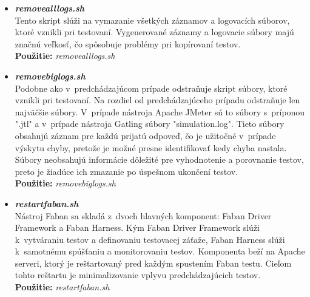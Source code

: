 \documentclass[12pt,oneside,final]{fithesis-utf8}
\newcommand\underscore[1]{\underline{\hspace{8pt}}}
\begin{document}
\begin{itemize}
\item \textit{\textbf{remove\underscore{}all\underscore{}logs.sh}}\\
Tento skript slúži na vymazanie všetkých záznamov a logovacích súborov, ktoré vznikli pri testovaní. Vygenerované záznamy a logovacie súbory majú značnú veľkosť, čo spôsobuje problémy pri kopírovaní testov.\\
\textbf{Použitie:} \textit{remove\underscore{}all\underscore{}logs.sh}

\item \textit{\textbf{remove\underscore{}big\underscore{}logs.sh}}\\
Podobne ako v~predchádzajúcom prípade odstraňuje skript súbory, ktoré vznikli pri testovaní. Na rozdiel od predchádzajúceho prípadu odstraňuje len najväčšie súbory. V~prípade nástroja Apache JMeter sú to súbory s~príponou "{}.jtl"{} a v~prípade nástroja Gatling súbory "{}simulation.log"{}. Tieto súbory obsahujú záznam pre každú prijatú odpoveď, čo je užitočné v~prípade výskytu chyby, pretože je možné presne identifikovať kedy chyba nastala. Súbory neobsahujú informácie dôležité pre vyhodnotenie a porovnanie testov, preto je žiadúce ich zmazanie po úspešnom ukončení testov.\\
\textbf{Použitie:} \textit{remove\underscore{}big\underscore{}logs.sh}

\item \textit{\textbf{restart\underscore{}faban.sh}}\\
Nástroj Faban sa skladá z~dvoch hlavných komponent: Faban Driver Framework a Faban Harness. Kým Faban Driver Framework slúži k~vytváraniu testov a definovaniu testovacej záťaže, Faban Harness slúži k~samotnému spúšťaniu a monitorovaniu testov. Komponenta beží na Apache serveri, ktorý je reštartovaný pred každým spustením Faban testu. Cieľom tohto reštartu je minimalizovanie vplyvu predchádzajúcich testov.\\
\textbf{Použitie:} \textit{restart\underscore{}faban.sh}


\end{itemize}
\end{document}
